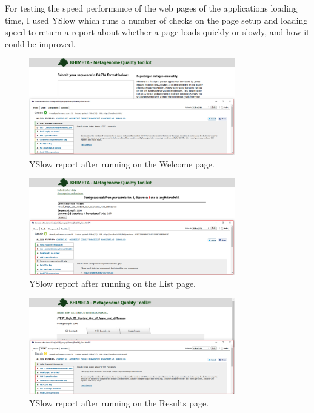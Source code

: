 For testing the speed performance of the web pages of the applications loading time, I used YSlow\cite{yslow} which runs a number of checks on the page setup and loading speed to return a report about whether a page loads quickly or slowly, and how it could be improved.

\begin{figure}[H]
\centering
\includegraphics[width=0.8\textwidth]{images/yslowpage1}
\caption{YSlow report after running on the Welcome page.}
\end{figure}

\begin{figure}[H]
\centering
\includegraphics[width=0.8\textwidth]{images/yslowpage2}
\caption{YSlow report after running on the List page.}
\end{figure}

\begin{figure}[H]
\centering
\includegraphics[width=0.8\textwidth]{images/yslowpage3}
\caption{YSlow report after running on the Results page.}
\end{figure}

